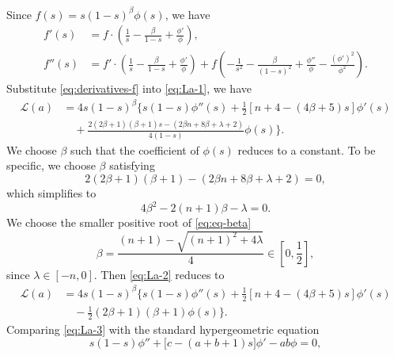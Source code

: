 \documentclass[reqno]{amsart}
\theoremstyle{remark}
\theoremstyle{definition}
\numberwithin{equation}{section}
\begin{document}
Since \(f(s) = s(1-s)^\beta \phi(s)\), we have 
\begin{equation}\label{eq:derivatives-f}
    \begin{aligned}
        f'(s) &= f\cdot\left(\frac{1}{s} - \frac{\beta}{1-s} + \frac{\phi'}{\phi}\right), \\
        f''(s) &= f'\cdot\left(\frac{1}{s} - \frac{\beta}{1-s} + \frac{\phi'}{\phi}\right) + f\left(-\frac{1}{s^2} - \frac{\beta}{(1-s)^2} + \frac{\phi''}{\phi} - \frac{(\phi')^2}{\phi^2}\right).
    \end{aligned}
\end{equation}
Substitute \eqref{eq:derivatives-f} into \eqref{eq:La-1}, we have 
\begin{equation}\label{eq:La-2}
    \begin{aligned}
        \mathcal{L}(a) &= 4s(1-s)^{\beta} \Big\{ s(1-s) \phi''(s) + \frac{1}{2}\left[ n + 4 - (4\beta+5)s \right] \phi'(s) \\
        &\quad + \frac{2(2\beta+1)(\beta+1)s - (2\beta n + 8\beta + \lambda + 2)}{4(1-s)} \phi(s) \Big\}.
    \end{aligned}
\end{equation}
We choose \(\beta\) such that the coefficient of \(\phi(s)\) reduces to a constant. To be specific, we choose \(\beta\) satisfying 
\begin{equation*}
    2(2\beta+1)(\beta+1) - (2\beta n + 8\beta + \lambda + 2) = 0,
\end{equation*}
which simplifies to 
\begin{equation}\label{eq:eq-beta}
    4\beta^2 - 2(n+1)\beta - \lambda = 0.
\end{equation}
We choose the smaller positive root of \eqref{eq:eq-beta} 
\begin{equation}\label{eq:choice-beta}
    \beta = \frac{(n+1) - \sqrt{(n+1)^2 + 4\lambda}}{4} \in [0,\frac{1}{2}],
\end{equation}
since $\lambda \in [-n, 0]$. 
Then \eqref{eq:La-2} reduces to 
\begin{equation}\label{eq:La-3}
    \begin{aligned}
        \mathcal{L}(a) &= 4s(1-s)^{\beta} \Big\{ s(1-s) \phi''(s) + \frac{1}{2}\left[ n + 4 - (4\beta+5)s \right] \phi'(s) \\
        &\quad - \frac{1}{2}(2\beta+1)(\beta+1)\phi(s) \Big\}.
    \end{aligned}
\end{equation}
Comparing \eqref{eq:La-3} with the standard hypergeometric equation 
\begin{equation}
    s(1-s)\phi'' + \big[c - (a+b+1)s\big]\phi' - ab\phi = 0,
\end{equation}
\end{document}
